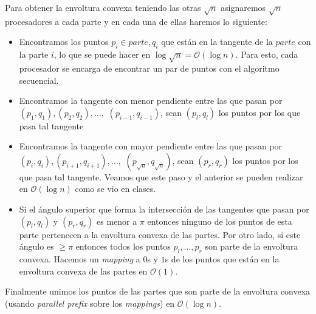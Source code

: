 \documentclass[dcc,uchile]{fcfmcourse}
\theoremstyle{plain}
\theoremstyle{definition}
\begin{document}
\begin{problems}
Para obtener la envoltura convexa teniendo las otras $\sqrt{n}$ asignaremos $\sqrt{n}$ procesadores a cada parte y en cada una de ellas haremos lo siguiente:
\begin{itemize}
    \item Encontramos los puntos $p_{i}\in parte, q_{i}$ que están en la tangente de la $parte$ con la parte $i$, lo que se puede hacer en $\log{\sqrt{n}} = \mathcal{O}(\log{n})$. Para esto, cada procesador se encarga de encontrar un par de puntos con el algoritmo secuencial.
    \item Encontramos la tangente con menor pendiente entre las que pasan por $(p_{1},q_{1}), (p_{2}, q_{2}), \ldots ,$ $(p_{i-1}, q_{i-1})$, sean $(p_{l}, q_{l})$ los puntos por los que pasa tal tangente
    \item Encontramos la tangente con mayor pendiente entre las que pasan por $(p_{i},q_{i}), (p_{i+1}, q_{i+1}), \ldots ,$ $(p_{\sqrt{n}}, q_{\sqrt{n}})$, sean $(p_{r}, q_{r})$ los puntos por los que pasa tal tangente. Veamos que este paso y el anterior se pueden realizar en $\mathcal{O}(\log{n})$ como se vio en clases.
    \item Si el ángulo superior que forma la intersección de las tangentes que pasan por $(p_{l}, q_{l})$ y $(p_{r}, q_{r})$ es menor a $\pi$ entonces ninguno de los puntos de esta parte pertenecen a la envoltura convexa de las partes. Por otro lado, si este ángulo es $\ge \pi$ entonces todos los puntos $p_{l}, \ldots, p_{r}$ son parte de la envoltura convexa. Hacemos un \textit{mapping} a $0$s y $1$s de los puntos que están en la envoltura convexa de las partes en $\mathcal{O}(1)$.
\end{itemize}
Finalmente unimos los puntos de las partes que son parte de la envoltura convexa (usando \textit{parallel prefix} sobre los \textit{mappings}) en $\mathcal{O}(\log{n})$.
\end{problems}
\end{document}
